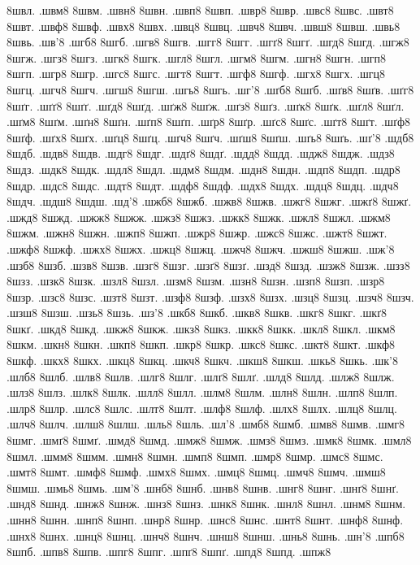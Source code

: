 {8швл.
.швм8
8швм.
.швн8
8швн.
.швп8
8швп.
.швр8
8швр.
.швс8
8швс.
.швт8
8швт.
.швф8
8швф.
.швх8
8швх.
.швц8
8швц.
.швч8
8швч.
.швш8
8швш.
.швь8
8швь.
.шв'8
.шгб8
8шгб.
.шгв8
8шгв.
.шгг8
8шгг.
.шгґ8
8шгґ.
.шгд8
8шгд.
.шгж8
8шгж.
.шгз8
8шгз.
.шгк8
8шгк.
.шгл8
8шгл.
.шгм8
8шгм.
.шгн8
8шгн.
.шгп8
8шгп.
.шгр8
8шгр.
.шгс8
8шгс.
.шгт8
8шгт.
.шгф8
8шгф.
.шгх8
8шгх.
.шгц8
8шгц.
.шгч8
8шгч.
.шгш8
8шгш.
.шгь8
8шгь.
.шг'8
.шґб8
8шґб.
.шґв8
8шґв.
.шґг8
8шґг.
.шґґ8
8шґґ.
.шґд8
8шґд.
.шґж8
8шґж.
.шґз8
8шґз.
.шґк8
8шґк.
.шґл8
8шґл.
.шґм8
8шґм.
.шґн8
8шґн.
.шґп8
8шґп.
.шґр8
8шґр.
.шґс8
8шґс.
.шґт8
8шґт.
.шґф8
8шґф.
.шґх8
8шґх.
.шґц8
8шґц.
.шґч8
8шґч.
.шґш8
8шґш.
.шґь8
8шґь.
.шґ'8
.шдб8
8шдб.
.шдв8
8шдв.
.шдг8
8шдг.
.шдґ8
8шдґ.
.шдд8
8шдд.
.шдж8
8шдж.
.шдз8
8шдз.
.шдк8
8шдк.
.шдл8
8шдл.
.шдм8
8шдм.
.шдн8
8шдн.
.шдп8
8шдп.
.шдр8
8шдр.
.шдс8
8шдс.
.шдт8
8шдт.
.шдф8
8шдф.
.шдх8
8шдх.
.шдц8
8шдц.
.шдч8
8шдч.
.шдш8
8шдш.
.шд'8
.шжб8
8шжб.
.шжв8
8шжв.
.шжг8
8шжг.
.шжґ8
8шжґ.
.шжд8
8шжд.
.шжж8
8шжж.
.шжз8
8шжз.
.шжк8
8шжк.
.шжл8
8шжл.
.шжм8
8шжм.
.шжн8
8шжн.
.шжп8
8шжп.
.шжр8
8шжр.
.шжс8
8шжс.
.шжт8
8шжт.
.шжф8
8шжф.
.шжх8
8шжх.
.шжц8
8шжц.
.шжч8
8шжч.
.шжш8
8шжш.
.шж'8
.шзб8
8шзб.
.шзв8
8шзв.
.шзг8
8шзг.
.шзґ8
8шзґ.
.шзд8
8шзд.
.шзж8
8шзж.
.шзз8
8шзз.
.шзк8
8шзк.
.шзл8
8шзл.
.шзм8
8шзм.
.шзн8
8шзн.
.шзп8
8шзп.
.шзр8
8шзр.
.шзс8
8шзс.
.шзт8
8шзт.
.шзф8
8шзф.
.шзх8
8шзх.
.шзц8
8шзц.
.шзч8
8шзч.
.шзш8
8шзш.
.шзь8
8шзь.
.шз'8
.шкб8
8шкб.
.шкв8
8шкв.
.шкг8
8шкг.
.шкґ8
8шкґ.
.шкд8
8шкд.
.шкж8
8шкж.
.шкз8
8шкз.
.шкк8
8шкк.
.шкл8
8шкл.
.шкм8
8шкм.
.шкн8
8шкн.
.шкп8
8шкп.
.шкр8
8шкр.
.шкс8
8шкс.
.шкт8
8шкт.
.шкф8
8шкф.
.шкх8
8шкх.
.шкц8
8шкц.
.шкч8
8шкч.
.шкш8
8шкш.
.шкь8
8шкь.
.шк'8
.шлб8
8шлб.
.шлв8
8шлв.
.шлг8
8шлг.
.шлґ8
8шлґ.
.шлд8
8шлд.
.шлж8
8шлж.
.шлз8
8шлз.
.шлк8
8шлк.
.шлл8
8шлл.
.шлм8
8шлм.
.шлн8
8шлн.
.шлп8
8шлп.
.шлр8
8шлр.
.шлс8
8шлс.
.шлт8
8шлт.
.шлф8
8шлф.
.шлх8
8шлх.
.шлц8
8шлц.
.шлч8
8шлч.
.шлш8
8шлш.
.шль8
8шль.
.шл'8
.шмб8
8шмб.
.шмв8
8шмв.
.шмг8
8шмг.
.шмґ8
8шмґ.
.шмд8
8шмд.
.шмж8
8шмж.
.шмз8
8шмз.
.шмк8
8шмк.
.шмл8
8шмл.
.шмм8
8шмм.
.шмн8
8шмн.
.шмп8
8шмп.
.шмр8
8шмр.
.шмс8
8шмс.
.шмт8
8шмт.
.шмф8
8шмф.
.шмх8
8шмх.
.шмц8
8шмц.
.шмч8
8шмч.
.шмш8
8шмш.
.шмь8
8шмь.
.шм'8
.шнб8
8шнб.
.шнв8
8шнв.
.шнг8
8шнг.
.шнґ8
8шнґ.
.шнд8
8шнд.
.шнж8
8шнж.
.шнз8
8шнз.
.шнк8
8шнк.
.шнл8
8шнл.
.шнм8
8шнм.
.шнн8
8шнн.
.шнп8
8шнп.
.шнр8
8шнр.
.шнс8
8шнс.
.шнт8
8шнт.
.шнф8
8шнф.
.шнх8
8шнх.
.шнц8
8шнц.
.шнч8
8шнч.
.шнш8
8шнш.
.шнь8
8шнь.
.шн'8
.шпб8
8шпб.
.шпв8
8шпв.
.шпг8
8шпг.
.шпґ8
8шпґ.
.шпд8
8шпд.
.шпж8
}
